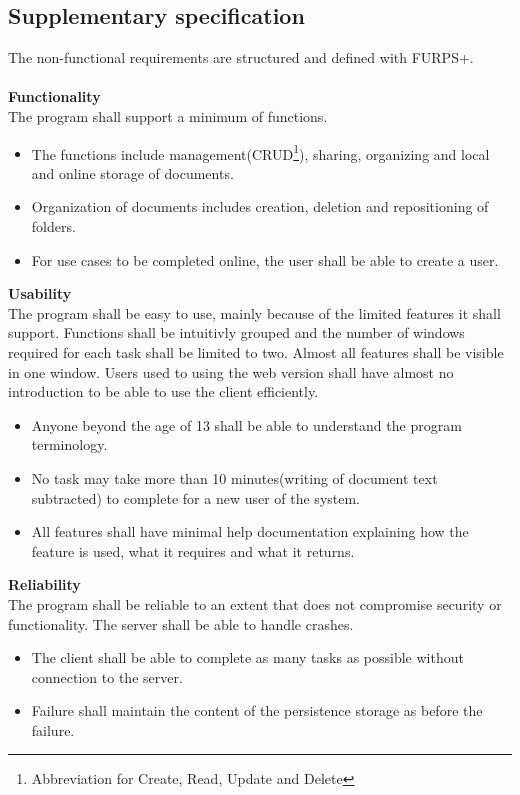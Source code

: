 \documentclass[a4paper,11pt,report]{report}
\begin{document}
\newpage

	\subsection{Supplementary specification}
	The non-functional requirements are structured and defined with FURPS+. \\ \\
\textbf{Functionality} \\
The program shall support a minimum of functions.
\begin{itemize}
\item The functions include management(CRUD\footnote[6]{Abbreviation for Create, Read, Update and Delete}), sharing, organizing and local and online storage of documents.
\item Organization of documents includes creation, deletion and repositioning of folders.
\item For use cases to be completed online, the user shall be able to create a user.
\end{itemize}
\textbf{Usability} \\
The program shall be easy to use, mainly because of the limited features it shall support. Functions shall be intuitivly grouped and the number of windows required for each task shall be limited to two. Almost all features shall be visible in one window. Users used to using the web version shall have almost no introduction to be able to use the client efficiently.
\begin{itemize}
\item Anyone beyond the age of 13 shall be able to understand the program terminology.
\item No task may take more than 10 minutes(writing of document text subtracted) to complete for a new user of the system.
\item All features shall have minimal help documentation explaining how the feature is used, what it requires and what it returns.
\end{itemize}
\textbf{Reliability} \\
The program shall be reliable to an extent that does not compromise security or functionality. The server shall be able to handle crashes.
\begin{itemize}
\item The client shall be able to complete as many tasks as possible without connection to the server.
\item Failure shall maintain the content of the persistence storage as before the failure.
\end{itemize}
\end{document}
